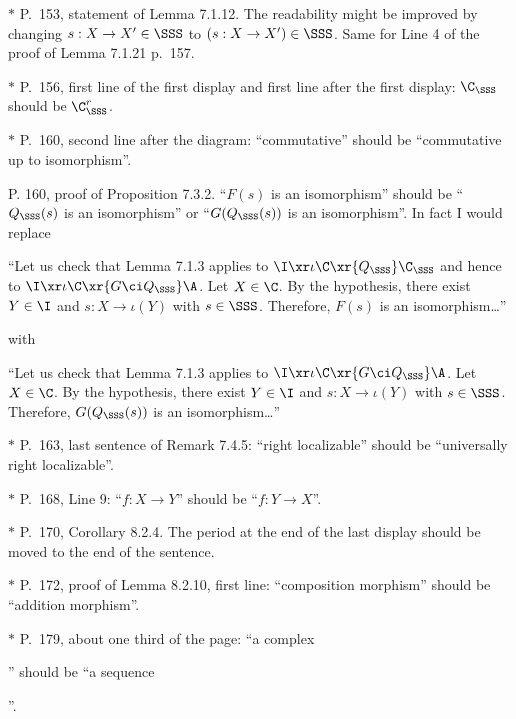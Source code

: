 \documentclass[12pt]{article}
\theoremstyle{remark}
\theoremstyle{definition}
\begin{document}
\nn$*$ P.~153, statement of Lemma 7.1.12. The readability might be improved by changing $s:X\to X'\in\SSS$ to $(s:X\to X')\in\SSS$. Same for Line 4 of the proof of Lemma 7.1.21 p.~157.

\nn$*$ P.~156, first line of the first display and first line after the first display: $\C_\SSS$ should be $\C_\SSS^r$.

\nn$*$ P.~160, second line after the diagram: ``commutative'' should be ``commutative up to isomorphism''. %

%

\begin{s}
P. 160, proof of Proposition 7.3.2. ``$F(s)$ is an isomorphism'' should be ``$Q_\SSS(s)$ is an isomorphism'' or ``$G(Q_\SSS(s))$ is an isomorphism''. In fact I would replace 

\nn``Let us check that Lemma 7.1.3 applies to $\I\xr\iota\C\xr{Q_\SSS}\C_\SSS$ and hence to $\I\xr\iota\C\xr{G\ci Q_\SSS}\A$. Let $X\in\C$. By the hypothesis, there exist $Y\in\I$ and $s:X\to\iota(Y)$ with $s\in\SSS$. Therefore, $F(s)$ is an isomorphism\dots''

\nn with

\nn``Let us check that Lemma 7.1.3 applies to $\I\xr\iota\C\xr{G\ci Q_\SSS}\A$. Let $X\in\C$. By the hypothesis, there exist $Y\in\I$ and $s:X\to\iota(Y)$ with $s\in\SSS$. Therefore, $G(Q_\SSS(s))$ is an isomorphism\dots''
\end{s}

%

\nn$*$ P.~163, last sentence of Remark 7.4.5: ``right localizable'' should be ``universally right localizable''.

\nn$*$ P.~168, Line 9: ``$f:X\to Y$'' should be ``$f:Y\to X$''.

\nn$*$ P.~170, Corollary 8.2.4. The period at the end of the last display should be moved to the end of the sentence.

\nn$*$ P.~172, proof of Lemma 8.2.10, first line: ``composition morphism'' should be ``addition morphism''.

\nn$*$ P.~179, about one third of the page: ``a complex 
'' 
should be ``a sequence 
''.
\end{document}

